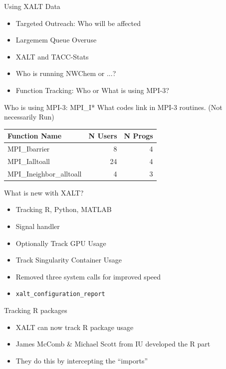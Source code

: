 \documentclass{beamer}
\begin{document}
\begin{frame}{Using XALT Data}
  \begin{itemize}
    \item Targeted Outreach: Who will be affected
    \item Largemem Queue Overuse
    \item XALT and TACC-Stats
    \item Who is running NWChem or ...?
    \item Function Tracking: Who or What is using MPI-3?      
  \end{itemize}
\end{frame}

\begin{frame}{Who is using MPI-3: MPI\_I*}
    What codes link in MPI-3 routines.  (Not necessarily Run)
    \begin{tabular}{|l|r|r|}
        \hline
        Function Name            & N Users    & N Progs \\\hline\hline
        MPI\_Ibarrier            &  8         & 4       \\\hline
        MPI\_Ialltoall           & 24         & 4       \\\hline
        MPI\_Ineighbor\_alltoall &  4         & 3       \\\hline
    \end{tabular}

\end{frame}

\begin{frame}{What is new with XALT?}
  \begin{itemize}
    \item Tracking R, Python, MATLAB
    \item Signal handler
    \item Optionally Track GPU Usage
    \item Track Singularity Container Usage
    \item Removed three system calls for improved speed
    \item \texttt{xalt\_configuration\_report}
  \end{itemize}
\end{frame}

\begin{frame}{Tracking R packages}
  \begin{itemize}
    \item XALT can now track R package usage
    \item James McComb \& Michael Scott from IU developed the R part
    \item They do this by intercepting the ``imports''
  \end{itemize}
\end{frame}
\end{document}
